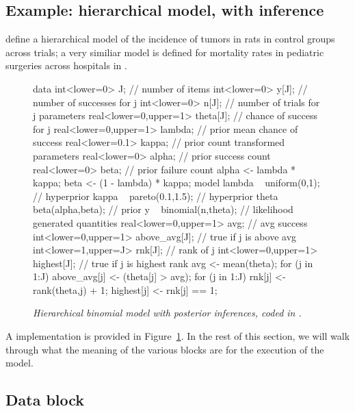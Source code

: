 \documentclass[article]{jss}
\begin{document}
\subsection{Example: hierarchical model, with inference}

\cite[Section 5.1]{GelmanEtAl:2013} define a hierarchical model of the
incidence of tumors in rats in control groups across trials; a very
similiar model is defined for mortality rates in pediatric surgeries
across hospitals in \citep[Examples, Volume
1]{LunnEtAl:2000,LunnEtAl:2009}.  
%  
\begin{figure}
\begin{Code}
data {
  int<lower=0> J;                         // number of items
  int<lower=0> y[J];                      // number of successes for j
  int<lower=0> n[J];                      // number of trials for j
}
parameters {
  real<lower=0,upper=1> theta[J];        // chance of success for j
  real<lower=0,upper=1> lambda;          // prior mean chance of success
  real<lower=0.1> kappa;                 // prior count
}
transformed parameters {
  real<lower=0> alpha;                   // prior success count
  real<lower=0> beta;                    // prior failure count
  alpha <- lambda * kappa;
  beta <- (1 - lambda) * kappa;
}
model {
  lambda ~ uniform(0,1);                 // hyperprior
  kappa ~ pareto(0.1,1.5);               // hyperprior 
  theta ~ beta(alpha,beta);              // prior
  y ~ binomial(n,theta);                 // likelihood
}
generated quantities {
  real<lower=0,upper=1> avg;             // avg success
  int<lower=0,upper=1> above_avg[J];     // true if j is above avg
  int<lower=1,upper=J> rnk[J];           // rank of j
  int<lower=0,upper=1> highest[J];          // true if j is highest rank
  avg <- mean(theta);
  for (j in 1:J)
    above_avg[j] <- (theta[j] > avg);
  for (j in 1:J) {
    rnk[j] <- rank(theta,j) + 1;
    highest[j] <- rnk[j] == 1;
  }
}
\end{Code}
  \caption{\it Hierarchical binomial model with posterior inferences,
    coded in .}\label{hier-binom.fig}
\end{figure}
%
A  implementation is provided in
Figure~\ref{hier-binom.fig}.  In the rest of this section, we will
walk through what the meaning of the various blocks are for the
execution of the model.

\subsection{Data block}
\end{document}
